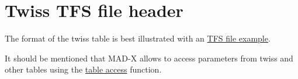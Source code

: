 
\section{Twiss TFS file header}
\label{sec:twiss}
 
The format of the twiss table is best illustrated with an
\href{select.html#tfs}{TFS file example}.  

It should be mentioned that MAD-X allows to access parameters from twiss
and other tables using the
\href{../Introduction/expression.html#table}{table access} function.  

